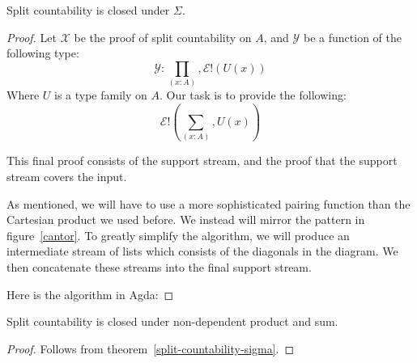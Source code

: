 \begin{rm-theorem} \label{split-countability-sigma}
  Split countability is closed under \(\Sigma\).
\end{rm-theorem}
\begin{proof}
  Let \(\mathcal{X}\) be the proof of split countability on \(A\), and
  \(\mathcal{Y}\) be a function of the following type:
  \begin{equation}
    \mathcal{Y} : \prod_{(x : A)} , \mathcal{E}!(U(x))
  \end{equation}
  Where \(U\) is a type family on \(A\).
  Our task is to provide the following:
  \begin{equation}
    \mathcal{E}!\left(\sum_{(x : A)} , U(x)\right)
  \end{equation}

  This final proof consists of the support stream, and the proof that the
  support stream covers the input.

  As mentioned, we will have to use a more sophisticated pairing function than
  the Cartesian product we used before.
  We instead will mirror the pattern in figure~\ref{cantor}.
  To greatly simplify the algorithm, we will produce an intermediate stream of
  lists which consists of the diagonals in the diagram.
  We then concatenate these streams into the final support stream.

  Here is the algorithm in Agda:
\end{proof}
\begin{rm-lemma}
  Split countability is closed under non-dependent product and sum.
\end{rm-lemma}
\begin{proof}
  Follows from theorem~\ref{split-countability-sigma}.
\end{proof}
